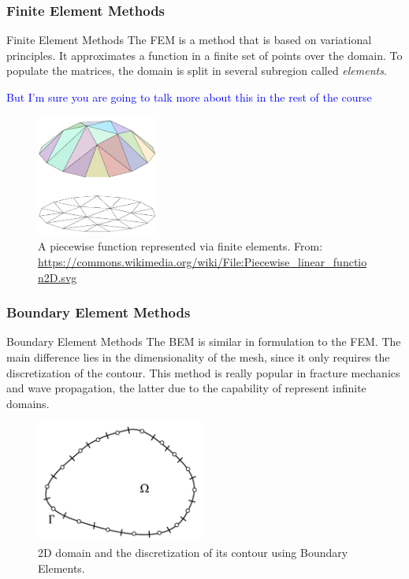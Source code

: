 \documentclass{beamer}
\begin{document}
\subsubsection{Finite Element Methods}
\begin{frame}{Finite Element Methods}
The FEM is a method that is based on variational principles. It approximates a function in a finite set of points over the domain. To populate the matrices, the domain is split in several subregion called \emph{elements}.

\textcolor{blue}{But I'm sure you are going to talk more about this in the rest of the course}
\begin{figure}
\includegraphics[height=4cm]{img/Piecewise_linear_function2D.pdf} 
\caption{A piecewise function represented via {finite elements}. From: \url{https://commons.wikimedia.org/wiki/File:Piecewise_linear_function2D.svg}}
\end{figure}

\end{frame}

\subsubsection{Boundary Element Methods}
\begin{frame}{Boundary Element Methods}
The BEM is similar in formulation to the FEM. The main difference lies in the dimensionality of the mesh, since it only requires the discretization of the contour. This method is really popular in fracture mechanics and wave propagation, the latter due to the capability of represent infinite domains.
\begin{figure}
\includegraphics[height=4cm]{img/BEM.pdf} 
\caption{2D domain and the discretization of its contour using Boundary Elements.}
\end{figure}

\end{frame}
\end{document}
